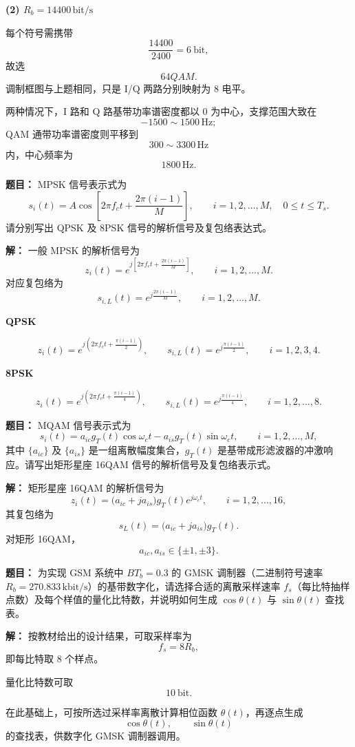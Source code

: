 \textbf{(2) $R_b=14400\,\mathrm{bit/s}$}\par
每个符号需携带
\[
\frac{14400}{2400}=6\ \text{bit},
\]
故选
\[
64QAM.
\]
调制框图与上题相同，只是 I/Q 两路分别映射为 8 电平。

两种情况下，I 路和 Q 路基带功率谱密度都以 0 为中心，支撑范围大致在
\[
-1500\sim1500\,\mathrm{Hz};
\]
QAM 通带功率谱密度则平移到
\[
300\sim3300\,\mathrm{Hz}
\]
内，中心频率为
\[
1800\,\mathrm{Hz}.
\]

\medskip
{}
\textbf{题目：}
MPSK 信号表示式为
\[
s_i(t)=A\cos\!\left[2\pi f_ct+\frac{2\pi(i-1)}{M}\right],
\qquad i=1,2,\dots,M,\quad 0\le t\le T_s.
\]
请分别写出 QPSK 及 8PSK 信号的解析信号及复包络表达式。

\par\textbf{解：}
一般 MPSK 的解析信号为
\[
z_i(t)=e^{j\left[2\pi f_ct+\frac{2\pi(i-1)}{M}\right]},
\qquad i=1,2,\dots,M.
\]
对应复包络为
\[
s_{i,L}(t)=e^{j\frac{2\pi(i-1)}{M}},
\qquad i=1,2,\dots,M.
\]

\textbf{QPSK}\par
\[
z_i(t)=e^{j\left(2\pi f_ct+\frac{\pi(i-1)}{2}\right)},
\qquad
s_{i,L}(t)=e^{j\frac{\pi(i-1)}{2}},
\qquad i=1,2,3,4.
\]

\textbf{8PSK}\par
\[
z_i(t)=e^{j\left(2\pi f_ct+\frac{\pi(i-1)}{4}\right)},
\qquad
s_{i,L}(t)=e^{j\frac{\pi(i-1)}{4}},
\qquad i=1,2,\dots,8.
\]

\medskip
{}
\textbf{题目：}
MQAM 信号表示式为
\[
s_i(t)=a_{ic}g_T(t)\cos\omega_ct-a_{is}g_T(t)\sin\omega_ct,
\qquad i=1,2,\dots,M,
\]
其中 $\{a_{ic}\}$ 及 $\{a_{is}\}$ 是一组离散幅度集合，$g_T(t)$ 是基带成形滤波器的冲激响应。请写出矩形星座 16QAM 信号的解析信号及复包络表示式。

\par\textbf{解：}
矩形星座 16QAM 的解析信号为
\[
z_i(t)=\bigl(a_{ic}+ja_{is}\bigr)g_T(t)e^{j\omega_ct},
\qquad i=1,2,\dots,16,
\]
其复包络为
\[
s_L(t)=\bigl(a_{ic}+ja_{is}\bigr)g_T(t).
\]
对矩形 16QAM，
\[
a_{ic},a_{is}\in\{\pm1,\pm3\}.
\]

\medskip
{}
\textbf{题目：}
为实现 GSM 系统中 $BT_b=0.3$ 的 GMSK 调制器（二进制符号速率 $R_b=270.833\,\mathrm{kbit/s}$）的基带数字化，请选择合适的离散采样速率 $f_s$（每比特抽样点数）及每个样值的量化比特数，并说明如何生成 $\cos\theta(t)$ 与 $\sin\theta(t)$ 查找表。

\par\textbf{解：}
按教材给出的设计结果，可取采样率为
\[
f_s=8R_b,
\]
即每比特取 8 个样点。

量化比特数可取
\[
10\ \text{bit}.
\]

在此基础上，可按所选过采样率离散计算相位函数 $\theta(t)$，再逐点生成
\[
\cos\theta(t),\qquad \sin\theta(t)
\]
的查找表，供数字化 GMSK 调制器调用。

\medskip
